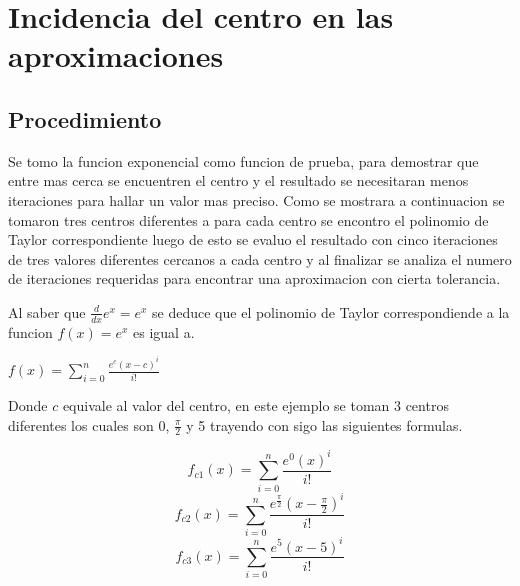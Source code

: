 \documentclass[12pt]{article}
\begin{document}
    \section{Incidencia del centro en las aproximaciones}
        \subsection{Procedimiento}
        Se tomo la funcion exponencial como funcion de prueba, para demostrar que entre mas 
        cerca se encuentren el centro y el resultado se necesitaran menos iteraciones para 
        hallar un valor mas preciso.
        Como se mostrara a continuacion se tomaron tres centros diferentes a para cada centro
        se encontro el polinomio de Taylor correspondiente luego de esto se evaluo el resultado
        con cinco iteraciones de tres valores diferentes cercanos a cada centro y al finalizar se
        analiza el numero de iteraciones requeridas para encontrar una aproximacion con cierta
        tolerancia.

        Al saber que $\frac{d}{dx} e^{x} = e^{x}$ se deduce que el polinomio de Taylor 
        correspondiende a la funcion $f(x) = e^{x}$ es igual a.
        \begin{center}
        \begin{math}
            f(x) = \sum_{i=0}^{n} \frac{e^{c}(x-c)^{i}}{i!}
        \end{math}
        \end{center}
        Donde $c$ equivale al valor del centro, en este ejemplo se toman 3 centros diferentes los
        cuales son 0, $\frac{\pi}{2}$ y 5 trayendo con sigo las siguientes formulas.
        
        \begin{equation}
            f_{c1}(x) = \sum_{i=0}^{n} \frac{e^{0}(x)^{i}}{i!}
        \end{equation}
        \begin{equation}
            f_{c2}(x) = \sum_{i=0}^{n} \frac{e^{\frac{\pi}{2}}(x-\frac{\pi}{2})^{i}}{i!}
        \end{equation}
        \begin{equation}
            f_{c3}(x) = \sum_{i=0}^{n} \frac{e^{5}(x-5)^{i}}{i!}
        \end{equation}
\end{document}
